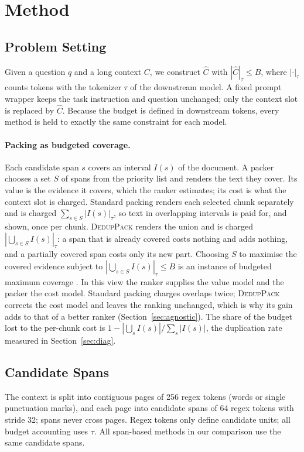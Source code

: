 \documentclass[11pt]{article}
\newcommand{\spk}{\textsc{DedupPack}}
\begin{document}
\section{Method}
\label{sec:method}

\subsection{Problem Setting}
Given a question $q$ and a long context $C$, we construct $\hat C$ with $|\hat C|_{\tau}\le B$, where $|\cdot|_{\tau}$ counts tokens with the tokenizer $\tau$ of the downstream model. A fixed prompt wrapper keeps the task instruction and question unchanged; only the context slot is replaced by $\hat C$. Because the budget is defined in downstream tokens, every method is held to exactly the same constraint for each model.

\paragraph{Packing as budgeted coverage.} Each candidate span $s$ covers an interval $I(s)$ of the document. A packer chooses a set $S$ of spans from the priority list and renders the text they cover. Its value is the evidence it covers, which the ranker estimates; its cost is what the context slot is charged. Standard packing renders each selected chunk separately and is charged $\sum_{s\in S}|I(s)|_\tau$, so text in overlapping intervals is paid for, and shown, once per chunk. \spk{} renders the union and is charged $|\bigcup_{s\in S} I(s)|_\tau$: a span that is already covered costs nothing and adds nothing, and a partially covered span costs only its new part. Choosing $S$ to maximise the covered evidence subject to $|\bigcup_{s\in S} I(s)|_\tau\le B$ is an instance of budgeted maximum coverage \citep{khuller1999budgeted}. In this view the ranker supplies the value model and the packer the cost model. Standard packing charges overlaps twice; \spk{} corrects the cost model and leaves the ranking unchanged, which is why its gain adds to that of a better ranker (Section~\ref{sec:agnostic}). The share of the budget lost to the per-chunk cost is $1-|\bigcup_{s}I(s)|/\sum_{s}|I(s)|$, the duplication rate measured in Section~\ref{sec:diag}.

\subsection{Candidate Spans}
The context is split into contiguous pages of 256 regex tokens (words or single punctuation marks), and each page into candidate spans of 64 regex tokens with stride 32; spans never cross pages. Regex tokens only define candidate units; all budget accounting uses $\tau$. All span-based methods in our comparison use the same candidate spans.
\end{document}
